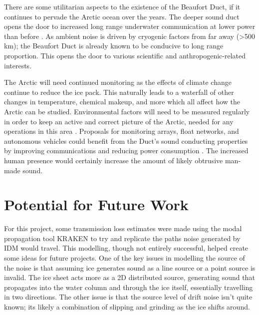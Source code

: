 There are some utilitarian aspects to the existence of the Beaufort Duct, if it continues to pervade the Arctic ocean over the years. The deeper sound duct opens the door to increased long range underwater communication at lower power than before \parencite{freitag2015underwatercomms} . As ambient noise is driven by cryogenic factors from far away (>500 km); the Beaufort Duct is already known to be conducive to long range proportion. This opens the door to various scientific and anthropogenic-related interests.

The Arctic will need continued monitoring as the effects of climate change continue to reduce the ice pack. This naturally leads to a waterfall of other changes in temperature, chemical makeup, and more which all affect how the Arctic can be studied. Environmental factors will need to be measured regularly in order to keep an active and correct picture of the Arctic, needed for any operations in this area \parencite{Schmidt2016commnav} . Proposals for monitoring arrays, float networks, and autonomous vehicles could benefit from the Duct's sound conducting properties by improving communications and reducing power consumption \parencite{kukulya2016development}. The increased human presence would certainly increase the amount of likely obtrusive man-made sound.



\section{Potential for Future Work}


For this project, some transmission loss estimates were made using the modal propagation tool KRAKEN to try and replicate the paths noise generated by IDM would travel. This modelling, though not entirely successful, helped create some ideas for future projects. One of the key issues in modelling the source of the noise is that assuming ice generates sound as a line source or a point source is invalid. The ice sheet acts more as a 2D distributed source, generating sound that propagates into the water column and through the ice itself, essentially travelling in two directions. The other issue is that the source level of drift noise isn't quite known; its likely a combination of slipping and grinding as the ice shifts around.

